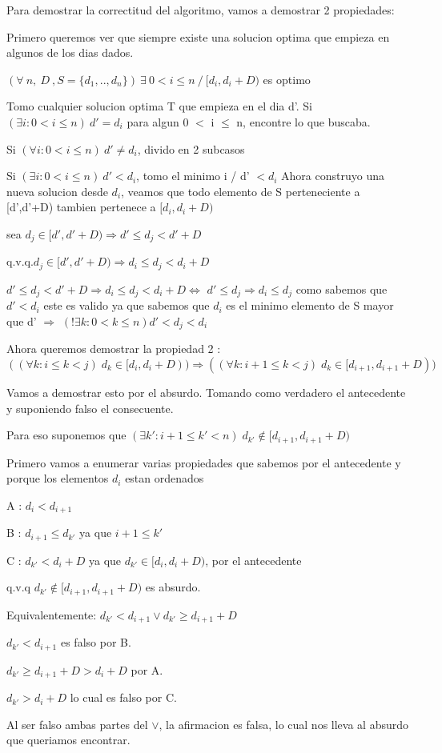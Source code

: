 Para demostrar la correctitud del algoritmo, vamos a demostrar 2 propiedades:

Primero queremos ver que siempre existe una solucion optima que empieza en algunos de los dias dados.

$(\forall \ n,\ D\ , S = \{d_1,..,d_n\} ) \ \exists \ 0 < i \leq n \ / \ [d_i,d_i + D )$ es optimo 

Tomo cualquier solucion optima T que empieza en el dia d'.
Si $(\exists i: 0 < i\leq n ) \ d' = d_i$ para algun 0 $<$ i $\leq$ n, encontre lo que buscaba.

Si $(\forall i: 0<i \leq n) \  d' \neq d_i$, divido en 2 subcasos

Si $(\exists i: 0<i\leq n) \ d' < d_i$, tomo el minimo i / d' $< d_i$
Ahora construyo una nueva solucion desde $d_i$, veamos que todo elemento de S perteneciente a [d',d'+D) tambien pertenece a $[d_i,d_i +D)$

sea $d_j \in [d',d'+D) \Rightarrow d' \leq d_j < d'+D $

q.v.q.$ d_j \in  [d',d'+D) \Rightarrow d_i \leq d_j < d_i+D $

$ d' \leq d_j < d'+D \Rightarrow d_i \leq d_j < d_i+D  \Leftrightarrow$    
$ d' \leq d_j \Rightarrow d_i \leq d_j$  como sabemos que $d' < d_i$
este es valido ya que sabemos que $d_i$ es el minimo elemento de S mayor que d' $\Rightarrow$ 
$( !\exists k: 0 < k \leq n) d' < d_j < d_i$

Ahora queremos demostrar la propiedad 2 : $((\forall k: i \leq k < j)\;d_k \in [d_i, d_i + D)) \Rightarrow ((\forall k: i + 1 \leq k < j)\;d_k \in [d_{i+1}, d_{i+1} + D))$

Vamos a demostrar esto por el absurdo. Tomando como verdadero el antecedente y suponiendo falso el consecuente.

Para eso suponemos que $(\exists k': i+1\leq k' < n) \;d_{k'} \notin [d_{i+1}, d_{i+1} + D) $

Primero vamos a enumerar varias propiedades que sabemos por el antecedente y porque los elementos $d_i$ estan ordenados

A : $d_i < d_{i+1}$

B : $d_{i+1} \leq d_{k'}$ ya que $i+1 \leq k'$

C : $d_{k'} < d_i +D$ ya que $d_{k'} \in [d_i,d_i +D)$, por el antecedente

q.v.q $d_{k'} \notin [d_{i+1}, d_{i+1} + D)$ es absurdo.

Equivalentemente: $d_{k'} < d_{i+1} \vee d_{k'} \geq d_{i+1} + D $ 

$d_{k'} < d_{i+1}$ es falso por B.

$d_{k'} \geq d_{i+1} + D  > d_i + D$ por A.

$d_{k'} > d_i + D$ lo cual es falso por C.

Al ser falso ambas partes del $\vee$, la afirmacion es falsa, lo cual nos lleva al absurdo que queriamos encontrar.

